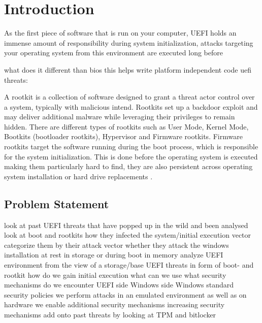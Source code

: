 

\chapter{Introduction}


As the first piece of software that is run on your computer, UEFI holds an immense amount of responsibility during system initialization, attacks targeting your operating system from this environment are executed long before

what does it different than bios
this helps write platform independent code
uefi threats:

A rootkit is a collection of software designed to grant a threat actor control over a system, typically with malicious intend.
Rootkits set up a backdoor exploit and may deliver additional malware while leveraging their privileges to remain hidden.
There are different types of rootkits such as User Mode, Kernel Mode, Bootkits (bootloader rootkits), Hypervisor and Firmware rootkits.
\cite{crowdstrike, techtarget, microsoft-secure-the-windows-boot-process}
Firmware rootkits target the software running during the boot process, which is responsible for the system initialization.
This is done before the operating system is executed making them particularly hard to find, they are also persistent across operating system installation or hard drive replacements \cite{crowdstrike}.


\section*{Problem Statement}
look at past \ac{UEFI} threats that have popped up in the wild and been analysed
look at boot and rootkits
how they infected the system/initial execution vector
categorize them by their attack vector
whether they attack the windows installation at rest in storage
or during boot in memory
analyze \ac{UEFI} environment from the view of a storage\-/base \ac{UEFI} threats in form of boot- and rootkit
how do we gain initial execution
what can we use
what security mechanisms do we encounter
\ac{UEFI} side
Windows side
Windows standard security policies
we perform attacks in an emulated environment as well as on hardware
we enable additional security mechanisms
increasing security mechanisms
add onto past threats by looking at TPM and bitlocker



